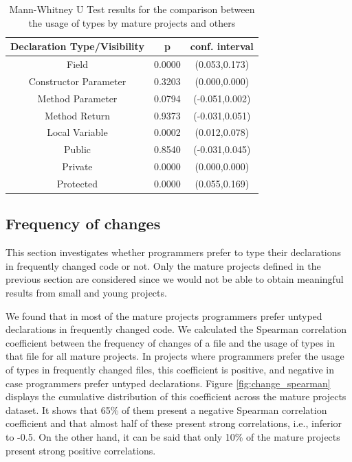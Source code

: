 \documentclass[preprint]{sigplanconf}
\begin{document}
\begin{table}[h!]
\centering{}%
\begin{tabular}{|c|c|c|}
\hline 
Declaration Type/Visibility 		& p & conf. interval \\
\hline 
\hline 
Field                  & 0.0000	& (0.053,0.173)	\\ \hline
Constructor Parameter  & 0.3203	& (0.000,0.000) \\ \hline
Method Parameter       & 0.0794	& (-0.051,0.002) \\ \hline
Method Return          & 0.9373	& (-0.031,0.051) \\ \hline
Local Variable         & 0.0002	& (0.012,0.078)	\\ \hline
\hline 
Public		& 0.8540	& (-0.031,0.045)	\\ \hline
Private		& 0.0000	& (0.000,0.000)		\\ \hline
Protected	& 0.0000	& (0.055,0.169)		\\ 
\hline 
\end{tabular}
\caption{Mann-Whitney U Test results for the comparison between the usage of types by mature projects and others}
\label{tab:size_utest_type+visibility}
\end{table}	





\subsection{Frequency of changes\label{sec:results-changes}}
This section investigates whether programmers prefer to type their declarations in frequently changed code or not.
Only the mature projects defined in the previous section are considered since we would not be able to obtain meaningful results from small and young projects.

We found that in most of the mature projects programmers prefer untyped declarations in frequently changed code.
We calculated the Spearman correlation coefficient between the frequency of changes of a file and the usage of types in that file for all mature projects.
In projects where programmers prefer the usage of types in frequently changed files, this coefficient is positive, and negative in case programmers prefer untyped declarations.
Figure \ref{fig:change_spearman} displays the cumulative distribution of this coefficient across the mature projects dataset.
It shows that 65\% of them present a negative Spearman correlation coefficient and that almost half of these present strong correlations, i.e., inferior to -0.5.
On the other hand, it can be said that only 10\% of the mature projects present strong positive correlations.
\end{document}
